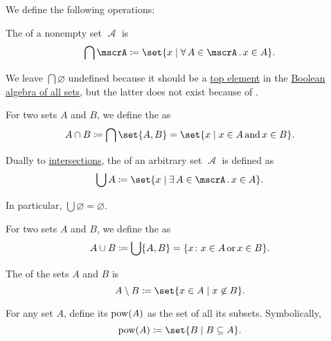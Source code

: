 \begin{definition}\label{def:set_operations}
  We define the following operations:

  \begin{thmenum}
     The  of a nonempty set \( \mscrA \) is
    \begin{equation*}
      \bigcap \mscrA \coloneqq \set{ x \given \qforall {A \in \mscrA} x \in A }.
    \end{equation*}

    We leave \( \bigcap \varnothing \) undefined because it should be a \hyperref[def:poset_extremal_points/top_and_bottom]{top element} in the \hyperref[thm:boolean_algebra_of_subsets]{Boolean algebra of all sets}, but the latter does not exist because of .

    For two sets \( A \) and \( B \), we define the  as
    \begin{equation*}
      A \cap B \coloneqq \bigcap \set{ A, B } = \set{ x \given x \in A \T{and} x \in B }.
    \end{equation*}

     Dually to \hyperref[def:set_intersection]{intersections}, the  of an arbitrary set \( \mscrA \) is defined as
    \begin{equation*}
      \bigcup A \coloneqq \set{ x \given \qexists {A \in \mscrA} x \in A }.
    \end{equation*}

    In particular, \( \bigcup \varnothing = \varnothing \).

    For two sets \( A \) and \( B \), we define the  as
    \begin{equation*}
      A \cup B \coloneqq \bigcup \{ A, B \} = \{ x \colon x \in A \T{or} x \in B \}.
    \end{equation*}

     The  of the sets \( A \) and \( B \) is
    \begin{equation*}
      A \setminus B \coloneqq \set{ x \in A \given x \not\in B }.
    \end{equation*}

     For any set \( A \), define its  \( \operatorname{pow}(A) \) as the set of all its subsets. Symbolically,
    \begin{equation*}
      \pow(A) \coloneqq \set{ B \given B \subseteq A }.
    \end{equation*}
  \end{thmenum}
\end{definition}

